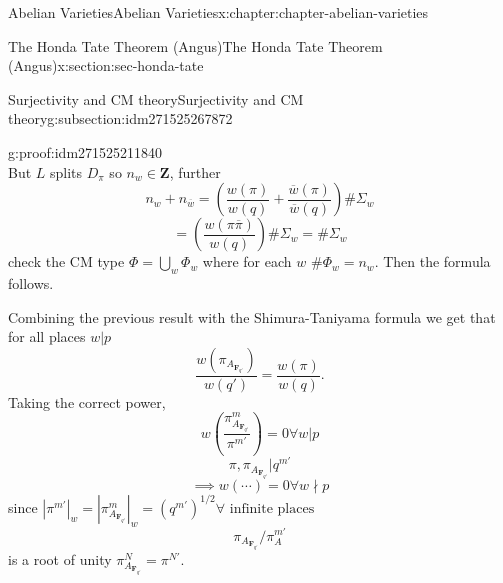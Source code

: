 \documentclass[oneside,10pt,]{book}
\numberwithin{equation}{section}
\newcommand{\ZZ}{\mathbf{Z}}
\newcommand{\FF}{\mathbf{F}}
\begin{document}
\begin{chapterptx}{Abelian Varieties}{}{Abelian Varieties}{}{}{x:chapter:chapter-abelian-varieties}
\begin{sectionptx}{The Honda Tate Theorem (Angus)}{}{The Honda Tate Theorem (Angus)}{}{}{x:section:sec-honda-tate}
\begin{subsectionptx}{Surjectivity and CM theory}{}{Surjectivity and CM theory}{}{}{g:subsection:idm271525267872}
\begin{proofptx}{}{g:proof:idm271525211840}
\begin{equation*}
\end{equation*}
But \(L\) splits \(D_\pi\) so \(n_w \in \ZZ\), further%
\begin{equation*}
n_w + n_{\overline w} = \left( \frac{w(\pi)}{w(q)}  + \frac{\overline w(\pi)}{\overline w(q)} \right) \#\Sigma_w
\end{equation*}
%
\begin{equation*}
= \left( \frac{w(\pi\overline \pi)}{w(q)} \right) \#\Sigma_w = \#\Sigma_w
\end{equation*}
check the CM type \(\Phi = \bigcup_w \Phi_w\) where for each \(w\) \(\# \Phi_w = n_w\). Then the formula follows.%
\end{proofptx}
Combining the previous result with the Shimura-Taniyama formula we get that for all places \(w|p\)%
\begin{equation*}
\frac{w(\pi_{A_{\FF_{q'}}})}{w(q')} = \frac{w(\pi)}{w(q)}\text{.}
\end{equation*}
Taking the correct power,%
\begin{equation*}
w\left( \frac {\pi^m_{A_{\FF_{q'}}}}{\pi^{m'}}\right) = 0 \forall w|p
\end{equation*}
%
\begin{equation*}
\pi,\pi_{A_{\FF_{q'}}}|q^{m'}
\end{equation*}
%
\begin{equation*}
\implies w(\cdots) = 0 \forall w \nmid p
\end{equation*}
since \(|\pi^{m'}|_w = |\pi_{A_{\FF_{q'}}}^m|_w = (q^{m'})^{1/2} \forall \text{ infinite places}\)%
\begin{equation*}
\pi_{A_{\FF_{q'}}}/ \pi_A^{m'}
\end{equation*}
is a root of unity \(\pi^N_{A_{\FF_{q'}}} = \pi^{N'}\).%
\end{subsectionptx}
\end{sectionptx}
\end{chapterptx}
%
%
\typeout{************************************************}
\typeout{************************************************}
%
\end{document}

